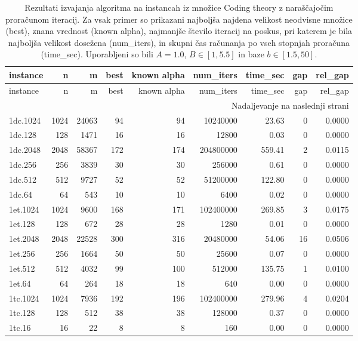 {\setlength{\LTcapwidth}{\textwidth}
\begin{longtable}{lrrrrrrrr}
\caption{Rezultati izvajanja algoritma na instancah iz množice Coding theory z naraščajočim proračunom iteracij. Za vsak primer so prikazani najboljša najdena velikost neodvisne množice (best), znana vrednost (known alpha), najmanjše število iteracij na poskus, pri katerem je bila najboljša velikost dosežena (num\_iters), in skupni čas računanja po vseh stopnjah proračuna (time\_sec). Uporabljeni so bili $A = 1.0$, $B \in [1, 5.5]$ in baze $b \in [1.5, 50]$.} \label{tab:results_budget_tiers_coding_theory} \\
\toprule
instance & n & m & best & known alpha & num\_iters & time\_sec & gap & rel\_gap \\
\midrule
\endfirsthead
\toprule
instance & n & m & best & known alpha & num\_iters & time\_sec & gap & rel\_gap \\
\midrule
\endhead
\midrule
\multicolumn{9}{r}{Nadaljevanje na naslednji strani} \\
\endfoot
\bottomrule
\endlastfoot
1dc.1024 & 1024 & 24063 & 94 & 94 & 10240000 & 23.63 & 0 & 0.0000 \\
1dc.128 & 128 & 1471 & 16 & 16 & 12800 & 0.03 & 0 & 0.0000 \\
1dc.2048 & 2048 & 58367 & 172 & 174 & 204800000 & 559.41 & 2 & 0.0115 \\
1dc.256 & 256 & 3839 & 30 & 30 & 256000 & 0.61 & 0 & 0.0000 \\
1dc.512 & 512 & 9727 & 52 & 52 & 51200000 & 122.80 & 0 & 0.0000 \\
1dc.64 & 64 & 543 & 10 & 10 & 6400 & 0.02 & 0 & 0.0000 \\
1et.1024 & 1024 & 9600 & 168 & 171 & 102400000 & 269.85 & 3 & 0.0175 \\
1et.128 & 128 & 672 & 28 & 28 & 1280 & 0.01 & 0 & 0.0000 \\
1et.2048 & 2048 & 22528 & 300 & 316 & 20480000 & 54.06 & 16 & 0.0506 \\
1et.256 & 256 & 1664 & 50 & 50 & 25600 & 0.07 & 0 & 0.0000 \\
1et.512 & 512 & 4032 & 99 & 100 & 512000 & 135.75 & 1 & 0.0100 \\
1et.64 & 64 & 264 & 18 & 18 & 640 & 0.00 & 0 & 0.0000 \\
1tc.1024 & 1024 & 7936 & 192 & 196 & 102400000 & 279.96 & 4 & 0.0204 \\
1tc.128 & 128 & 512 & 38 & 38 & 128000 & 0.37 & 0 & 0.0000 \\
1tc.16 & 16 & 22 & 8 & 8 & 160 & 0.00 & 0 & 0.0000 \\

\end{longtable}}
